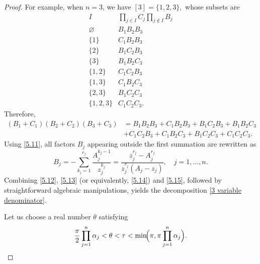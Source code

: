 \documentclass[12pt, reqno]{amsart}
\theoremstyle{definition}
\theoremstyle{remark}
\numberwithin{equation}{section}
\begin{document}
\begin{proof}
For example, when $n=3$, we have
$
[3]=\{1,2,3\},
$
whose subsets are
\[
\begin{array}{c|c}
I & \displaystyle\prod_{j\in I}C_j\prod_{j\notin I}B_j\\
\hline
\varnothing & B_1B_2B_3\\
\{1\} & C_1B_2B_3\\
\{2\} & B_1C_2B_3\\
\{3\} & B_1B_2C_3\\
\{1,2\} & C_1C_2B_3\\
\{1,3\} & C_1B_2C_3\\
\{2,3\} & B_1C_2C_3\\
\{1,2,3\} & C_1C_2C_3.
\end{array}
\]
Therefore,
\begin{equation}\label{5.14}
\begin{aligned}
(B_1+C_1)(B_2+C_2)(B_3+C_3)
&=
B_1B_2B_3
+C_1B_2B_3
+B_1C_2B_3
+B_1B_2C_3\\
&
+C_1C_2B_3
+C_1B_2C_3
+B_1C_2C_3
+C_1C_2C_3.
\end{aligned}
\end{equation}
Using \eqref{5.11}, all factors $B_j$ appearing outside the first summation are rewritten as
\begin{equation}\label{5.15}
B_j=
-\sum_{k_j=1}^{r_j}
\frac{A_j^{k_j-1}}{z_j^{k_j}}
=
\frac{z_j^{r_j}-A_j^{r_j}}
{z_j^{r_j}(A_j-z_j)},\quad j=1,\dots,n.
\end{equation}
Combining \eqref{5.12}, \eqref{5.13} (or equivalently, \eqref{5.14}) and \eqref{5.15}, followed by straightforward algebraic manipulations, yields the decomposition \eqref{3 variable denominator}.

Let us
choose a real number $\theta$ satisfying
\begin{equation}\label{5.16}
\frac{\pi}{2}\prod_{{j=1}}^n\alpha_j
<\theta<
\tau
<
\min\!\Bigl(\pi,\pi\prod_{{j=1}}^n\alpha_j\Bigr).
\end{equation}


\end{proof}
\end{document}
